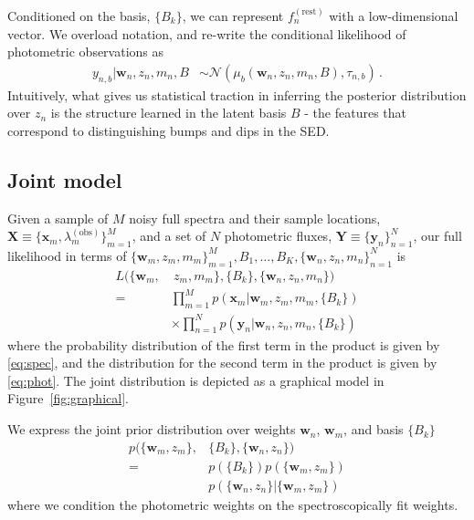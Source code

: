 \documentclass{article}
\begin{document}
Conditioned on the basis, $\{B_k\}$, we can represent $f_n^{(\text{rest})}$ with a low-dimensional vector.  We overload notation, and re-write the conditional likelihood of photometric observations as
\begin{align}
    y_{n,b} | \mathbf{w}_n, z_n, m_n, B &\sim \mathcal{N}( \mu_b(\mathbf{w}_n, z_n, m_n, B), \tau_{n,b} ) \, .
   \label{eq:phot}
\end{align}
Intuitively, what gives us statistical traction in inferring the posterior distribution over $z_n$ is the structure learned in the latent basis $B$ - the features that correspond to distinguishing bumps and dips in the SED.  

\subsection{Joint model}
Given a sample of $M$ noisy full spectra and their sample locations, $\mathbf{X} \equiv \{\mathbf{x}_m, \lambda^{(\text{obs})}_m \}_{m=1}^M$, and a set of $N$ photometric fluxes, $\mathbf{Y} \equiv \{\mathbf{y}_n\}_{n=1}^N$, our full likelihood in terms of $\{ \mathbf{w}_m, z_m, m_m \}_{m=1}^M, B_1, \dots, B_K, \{ \mathbf{w}_n, z_n, m_n \}_{n=1}^N$ is 
\begin{align*}
  L( \{ \mathbf{w}_m, &~z_m, m_m \}, \{ B_k \}, \{ \mathbf{w}_n, z_n, m_n\} )  \\
    = & \prod_{m=1}^M p( \mathbf{x}_m | \mathbf{w}_m, z_m, m_m, \{ B_k \})  \\
      & \times \prod_{n=1}^N p( \mathbf{y}_n | \mathbf{w}_n, z_n, m_n, \{ B_k \})
\end{align*}
where the probability distribution of the first term in the product is given by \ref{eq:spec}, and the distribution for the second term in the product is given by \ref{eq:phot}.  The joint distribution is depicted as a graphical model in Figure~\ref{fig:graphical}.

We express the joint prior distribution over weights $\mathbf{w}_n$, $\mathbf{w}_m$, and basis $\{B_k\}$
\begin{align}
  p( \{ \mathbf{w}_m, z_m \}, &\{ B_k \}, \{ \mathbf{w}_n, z_n \} )  \\
    = & p(\{ B_k \}) p( \{ \mathbf{w}_m, z_m \} )  \\
      & p( \{ \mathbf{w}_n, z_n \} | \{ \mathbf{w}_m, z_m \} ) 
\end{align}
where we condition the photometric weights on the spectroscopically fit weights.  

\end{document}
